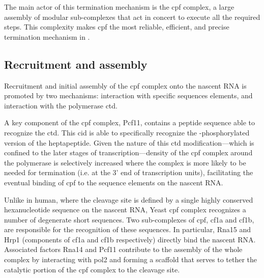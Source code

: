 The main actor of this termination mechanism is the \gls{cpf} complex, a large assembly of modular sub-complexes that act in concert to execute all the required steps. 
This complexity makes \gls{cpf} the most reliable, efficient, and precise termination mechanism in \cer{}.




\subsection{Recruitment and assembly}
Recruitment and initial assembly of the \gls{cpf} complex onto the nascent RNA is promoted by two mechanisms: interaction with specific sequences elements, and interaction with the polymerase \gls{ctd}.

A key component of the \gls{cpf} complex, Pcf11, contains a peptide sequence able to recognize the \gls{ctd}. This \gls{cid} is able to specifically recognize the \sert{}-phosphorylated version of the heptapeptide.
Given the nature of this \gls{ctd} modification---which is confined to the later stages of transcription---density of the \gls{cpf} complex around the polymerase is selectively increased where the complex is more likely to be needed for termination (i.e. at the 3' end of transcription units), facilitating the eventual binding of \gls{cpf} to the sequence elements on the nascent RNA.

Unlike in human, where the cleavage site is defined by a single highly conserved hexanucleotide sequence on the nascent RNA, Yeast \gls{cpf} complex recognizes a number of degenerate short sequences.
Two sub-complexes of \gls{cpf}, \gls{cf1a} and \gls{cf1b}, are responsible for the recognition of these sequences.
In particular, Rna15 and Hrp1 (components of \gls{cf1a} and \gls{cf1b} respectively) directly bind the nascent RNA.
Associated factors Rna14 and Pcf11 contribute to the assembly of the whole complex by interacting with \gls{pol2} and forming a scaffold that serves to tether the catalytic portion of the \gls{cpf} complex to the cleavage site.

